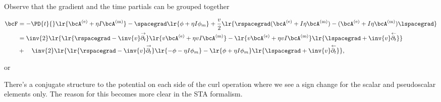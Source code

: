 Observe that the
gradient and the time partials can be grouped together

\begin{dmath}\label{eqn:potentialMethods:1060}
\begin{aligned}
\bcF
&=
- \PD{t}{ } \lr{\bcA^\e + \eta I \bcA^\m}
- \spacegrad \lr{ \phi + \eta I \phi_m }
+ \frac{v}{2} \lr{ \rspacegrad (\bcA^\e + I \eta \bcA^\m) - (\bcA^\e + I \eta \bcA^\m) \lspacegrad } \\
&=
\inv{2} \lr{
   \lr{ \rspacegrad - \inv{v} \rpartialt } \lr{ v \bcA^\e + \eta v I \bcA^\m }
   -
   \lr{ v \bcA^\e + \eta v I \bcA^\m} \lr{ \lspacegrad + \inv{v} \lpartialt }
} \\
&+\quad \inv{2} \lr{
   \lr{ \rspacegrad - \inv{v} \rpartialt } \lr{ -\phi - \eta I \phi_m }
   - \lr{ \phi + \eta I \phi_m } \lr{ \lspacegrad + \inv{v} \lpartialt }
}
,
\end{aligned}
\end{dmath}

or


There's a conjugate structure to the potential on each side of the curl operation where we see a sign change for the scalar and pseudoscalar elements only.  The reason for this becomes more clear in the STA formalism.


